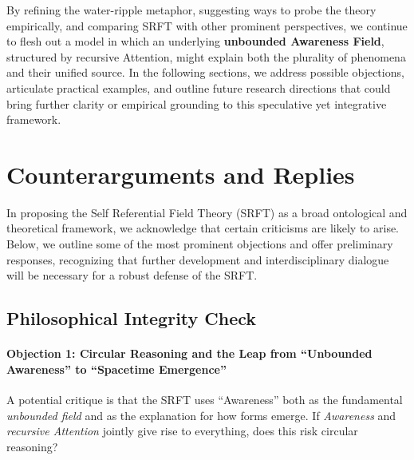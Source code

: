 \documentclass[12pt,a4paper]{article}
\begin{document}
By refining the water-ripple metaphor, suggesting ways to probe the theory empirically, and comparing SRFT with other prominent perspectives, we continue to flesh out a model in which an underlying \textbf{unbounded Awareness Field}, structured by recursive Attention, might explain both the plurality of phenomena and their unified source. In the following sections, we address possible objections, articulate practical examples, and outline future research directions that could bring further clarity or empirical grounding to this speculative yet integrative framework.



\section{Counterarguments and Replies}
\label{sec:counterarguments}

In proposing the Self Referential Field Theory (SRFT) as a broad ontological and theoretical framework, we acknowledge that certain criticisms are likely to arise. Below, we outline some of the most prominent objections and offer preliminary responses, recognizing that further development and interdisciplinary dialogue will be necessary for a robust defense of the SRFT.

\subsection{Philosophical Integrity Check}
\label{subsec:philosophical-check}

\paragraph{Objection 1: Circular Reasoning and the Leap from “Unbounded Awareness” to “Spacetime Emergence”}
A potential critique is that the SRFT uses ``Awareness'' both as the fundamental \emph{unbounded field} and as the explanation for how forms emerge. If \emph{Awareness} and \emph{recursive Attention} jointly give rise to everything, does this risk circular reasoning?
\end{document}
